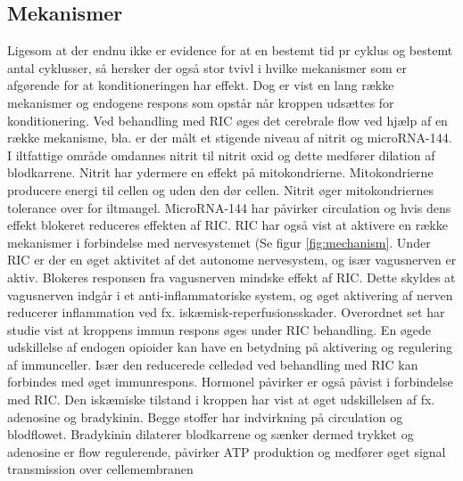 \subsection{Mekanismer}
Ligesom at der endnu ikke er evidence for at en bestemt tid pr cyklus og bestemt antal cyklusser, så hersker der også stor tvivl i hvilke mekanismer som er afgørende for at konditioneringen har effekt. Dog er vist en lang række mekanismer og endogene respons som opstår når kroppen udsættes for konditionering. Ved behandling med RIC øges det cerebrale flow ved hjælp af en række mekanisme, bla. er der målt et stigende niveau af nitrit og microRNA-144. I iltfattige område omdannes nitrit til nitrit oxid og dette medfører dilation af blodkarrene. Nitrit har ydermere en effekt på mitokondrierne. Mitokondrierne producere energi til cellen og uden den dør cellen. Nitrit øger mitokondriernes tolerance over for iltmangel. MicroRNA-144 har påvirker circulation og hvis dens effekt blokeret reduceres effekten af RIC. 
RIC har også vist at aktivere en række mekanismer i forbindelse med nervesystemet (Se figur \ref{fig:mechanism}. Under RIC er der en øget aktivitet af det autonome nervesystem, og især vagusnerven er aktiv. Blokeres responsen fra vagusnerven mindske effekt af RIC. Dette skyldes at vagusnerven indgår i et anti-inflammatoriske system, og øget aktivering af nerven reducerer inflammation ved fx. iskæmisk-reperfusionsskader. Overordnet set har studie vist at kroppens immun respons øges under RIC behandling.  En øgede udskillelse af endogen opioider kan have en betydning på aktivering og regulering af immunceller. Især den reducerede celledød ved behandling med RIC kan forbindes med øget immunrespons. Hormonel påvirker er også påvist i forbindelse med RIC. Den iskæmiske tilstand i kroppen har vist at øget udskillelsen af fx. adenosine og bradykinin. Begge stoffer har indvirkning på circulation og blodflowet. Bradykinin dilaterer blodkarrene og sænker dermed trykket og adenosine er flow regulerende, påvirker ATP produktion og medfører øget signal transmission over cellemembranen 

